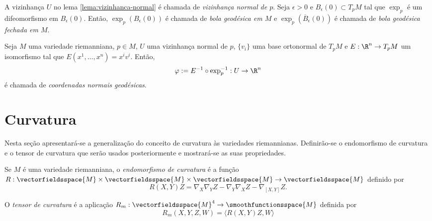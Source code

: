 \begin{definicao}
	A vizinhança $U$ no lema \ref{lema:vizinhanca-normal} é chamada de \emph{vizinhança normal de $p$}.
	Seja
	$\epsilon > 0$ e
	$B_{\epsilon}(0) \subset T_p M$ tal que $\exp_p$ é um difeomorfismo em $B_{\epsilon}(0)$.
	Então,
	$\exp_p(B_{\epsilon}(0))$ é chamada de \emph{bola geodésica em $M$} e
	$\exp_p(\overline{B}_{\epsilon}(0))$ é chamada de \emph{bola geodésica fechada em $M$}.
\end{definicao}

\begin{definicao}
	Seja
	$M$ uma variedade riemanniana,
	$p \in M$,
	$U$ uma vizinhança normal de $p$,
	$\{v_i\}$ uma base ortonormal de $T_p M$ e
	$E: \R^n \rightarrow T_p M$ um isomorfismo tal que $E(x^1,\ldots,x^n) = x^i v^i$.
	Então,
	\begin{equation*}
		\varphi := E^{-1} \circ \exp_p^{-1}: U \rightarrow \R^n
	\end{equation*}
	é chamada de \emph{coordenadas normais geodésicas}.
\end{definicao}

\section{Curvatura}

Nesta seção apresentará-se a generalização do conceito de curvatura às variedades riemannianas.
Definirão-se o endomorfismo de curvatura e o tensor de curvatura que serão usados posteriormente e mostrará-se as suas propriedades.


\begin{definicao}
	Se $M$ é uma variedade riemanniana, o \emph{endomorfismo de curvatura} é a função $R: \vectorfieldsspace{M} \times \vectorfieldsspace{M} \times \vectorfieldsspace{M} \rightarrow \vectorfieldsspace{M} $ definido por
	\begin{equation*}
		R(X,Y)Z = \nabla_X \nabla_Y Z - \nabla_Y \nabla_X Z - \nabla_{[X,Y]}Z.
	\end{equation*}
\end{definicao}


\begin{definicao}
	O \emph{tensor de curvatura} é a aplicação $R_m: \vectorfieldsspace{M}^4 \rightarrow \smoothfunctionsspace{M}$ definida por
	\begin{equation*}
		R_m (X,Y,Z,W) = \langle R(X,Y)Z,W \rangle
	\end{equation*}
\end{definicao}

